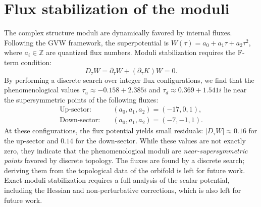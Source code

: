 \documentclass[12pt,a4paper]{article}
\numberwithin{equation}{section}
\begin{document}
\section{Flux stabilization of the moduli}
\label{sec:flux_stabilization}
The complex structure moduli are dynamically favored by internal
fluxes. Following the GVW framework, the superpotential is
\(W(\tau) = a_0 + a_1 \tau + a_2 \tau^2\), where \(a_i \in \mathbb{Z}\)
are quantized flux numbers. Moduli stabilization requires the F-term
condition:
\begin{equation}
D_\tau W = \partial_\tau W + (\partial_\tau K) W = 0.
\end{equation}
By performing a discrete search over integer flux configurations, we
find that the phenomenological values
\(\tau_u \approx -0.158 + 2.385i\) and
\(\tau_d \approx 0.369 + 1.541i\) lie near the supersymmetric points
of the following fluxes:
\begin{align}
\text{Up-sector:} \quad & (a_0, a_1, a_2) = (-17, 0, 1), \\
\text{Down-sector:} \quad & (a_0, a_1, a_2) = (-7, -1, 1).
\end{align}
At these configurations, the flux potential yields small residuals:
\(|D_\tau W| \approx 0.16\) for the up-sector and \(0.14\) for the
down-sector. While these values are not exactly zero, they indicate
that the phenomenological moduli are \emph{near-supersymmetric points}
favored by discrete topology. The fluxes are found by a discrete search;
deriving them from the topological data of the orbifold is left for
future work. Exact moduli stabilization requires a full analysis of
the scalar potential, including the Hessian and non-perturbative
corrections, which is also left for future work.
\end{document}
